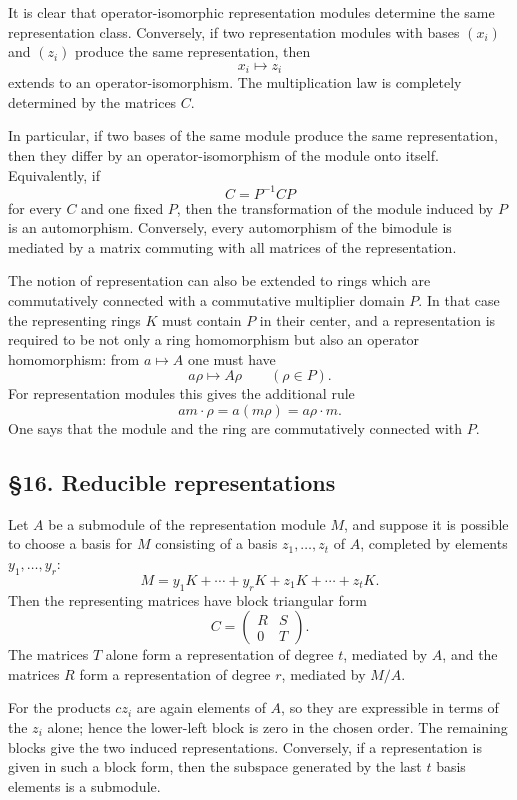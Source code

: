 \documentclass[11pt]{article}
\begin{document}
It is clear that operator-isomorphic representation modules determine
the same representation class. Conversely, if two representation modules
with bases \((x_i)\) and \((z_i)\) produce the same representation, then
\[
  x_i\mapsto z_i
\] extends to an operator-isomorphism. The multiplication law is
completely determined by the matrices \(C\).

In particular, if two bases of the same module produce the same
representation, then they differ by an operator-isomorphism of the
module onto itself. Equivalently, if \[
  C=P^{-1}CP
\] for every \(C\) and one fixed \(P\), then the transformation of the
module induced by \(P\) is an automorphism. Conversely, every
automorphism of the bimodule is mediated by a matrix commuting with all
matrices of the representation.

The notion of representation can also be extended to rings which are
commutatively connected with a commutative multiplier domain \(P\). In
that case the representing rings \(K\) must contain \(P\) in their
center, and a representation is required to be not only a ring
homomorphism but also an operator homomorphism: from \(a\mapsto A\) one
must have \[
  a\rho\mapsto A\rho\qquad(\rho\in P).
\] For representation modules this gives the additional rule \[
  am\cdot\rho=a(m\rho)=a\rho\cdot m.
\] One says that the module and the ring are commutatively connected
with \(P\).

\subsection{§16. Reducible
representations}\label{reducible-representations}

Let \(A\) be a submodule of the representation module \(M\), and suppose
it is possible to choose a basis for \(M\) consisting of a basis
\(z_1,\ldots,z_t\) of \(A\), completed by elements \(y_1,\ldots,y_r\):
\[
  M=y_1K+\cdots+y_rK+z_1K+\cdots+z_tK.
\] Then the representing matrices have block triangular form \[
  C=\begin{pmatrix} R&S\\0&T\end{pmatrix}.
\] The matrices \(T\) alone form a representation of degree \(t\),
mediated by \(A\), and the matrices \(R\) form a representation of
degree \(r\), mediated by \(M/A\).

For the products \(cz_i\) are again elements of \(A\), so they are
expressible in terms of the \(z_i\) alone; hence the lower-left block is
zero in the chosen order. The remaining blocks give the two induced
representations. Conversely, if a representation is given in such a
block form, then the subspace generated by the last \(t\) basis elements
is a submodule.
\end{document}
